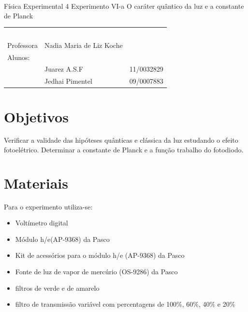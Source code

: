 \documentclass[a4paper,11pt]{article}
\begin{document}
\MakeMyTitlePage
{Física Experimental 4}
{Experimento VI-a}
{O caráter quântico da luz e a constante de Planck}
{%
		\begin{tabular}{llr} \
		& & \\[0.05cm]		
		Professora & Nadia Maria de Liz Koche & \\
		
		Alunos:& & \\
		& Juarez A.S.F 					& 11/0032829\\
		& Jedhai Pimentel				& 09/0007883\\
	[0.05cm]	
		\end{tabular}
}

\section{Objetivos}
\paragraph{}Verificar a validade das hipóteses quânticas e
clássica da luz estudando o efeito fotoelétrico. Determinar 
a constante de Planck e a função trabalho do fotodiodo.
\section{Materiais}
\paragraph{} Para o experimento utiliza-se:
\begin{itemize}
  \item Voltímetro digital
  \item Módulo h/e(AP-9368) da Pasco
  \item Kit de acessórios para o módulo h/e (AP-9368) da
    Pasco
  \item Fonte de luz de vapor de mercúrio (OS-9286) da Pasco
  \item filtros de verde e de amarelo
  \item filtro de transmissão variável com percentagens de
    100\%, 60\%, 40\% e 20\%
  \end{itemize}
\end{document}
